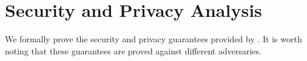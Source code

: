 \section{Security and Privacy Analysis}
\label{sec:analysis}


We formally prove the security and privacy guarantees provided by \usso.
\newc
It is worth noting that these guarantees are proved against different adversaries.
\oldc








